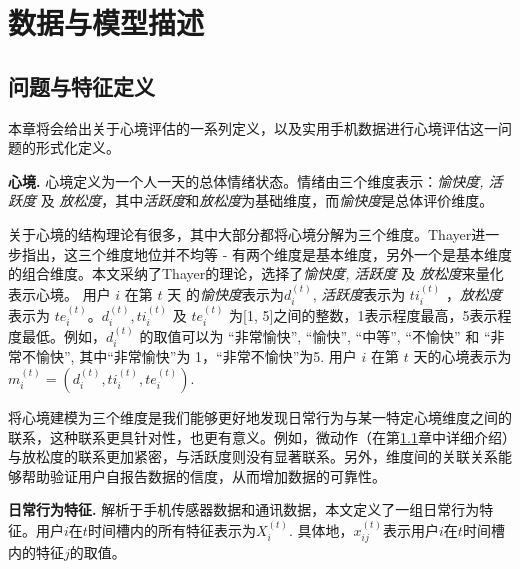 \section{数据与模型描述}\label{mood:data}

\subsection{问题与特征定义}
\label{mood:sec:ProblemAndFeatureDefinition}

本章将会给出关于心境评估的一系列定义，以及实用手机数据进行心境评估这一问题的形式化定义。
\begin{definition}
\textbf{心境.} 心境定义为一个人一天的总体情绪状态。情绪由三个维度表示：\textit{愉快度, 活跃度} 及 \textit{放松度}，其中\textit{活跃度}和\textit{放松度}为基础维度，而\textit{愉快度}是总体评价维度。
\end{definition}

关于心境的结构理论有很多，其中大部分都将心境分解为三个维度。Thayer\cite{mood}进一步指出，这三个维度地位并不均等 - 有两个维度是基本维度，另外一个是基本维度的组合维度。本文采纳了Thayer的理论，选择了\textit{愉快度, 活跃度} 及 \textit{放松度}来量化表示心境\cite{mooddimension}。 用户 $i$ 在第 $t$ 天 的\textit{愉快度}表示为$d_i^{(t)}$, \textit{活跃度}表示为 $ti_i^{(t)}$ ，\textit{放松度}表示为 $te_i^{(t)}$。$d_i^{(t)}, ti_i^{(t)}$ 及 $te_i^{(t)}$ 为[1, 5]之间的整数，1表示程度最高，5表示程度最低。例如，$d_i^{(t)}$ 的取值可以为 ``非常愉快'', ``愉快'', ``中等'', ``不愉快'' 和 ``非常不愉快'', 其中``非常愉快''为 1，``非常不愉快''为5. 用户 $i$ 在第 $t$ 天的心境表示为 $m_i^{(t)} = (d_i^{(t)}, ti_i^{(t)}, te_i^{(t)})$. 

将心境建模为三个维度是我们能够更好地发现日常行为与某一特定心境维度之间的联系，这种联系更具针对性，也更有意义。例如，微动作（在第\ref{mood:sec:ProblemAndFeatureDefinition}章中详细介绍）与放松度的联系更加紧密，与活跃度则没有显著联系。另外，维度间的关联关系能够帮助验证用户自报告数据的信度，从而增加数据的可靠性。

\begin{definition}
\textbf{日常行为特征.} 解析于手机传感器数据和通讯数据，本文定义了一组日常行为特征。用户$i$在$t$时间槽内的所有特征表示为$X_i^{(t)}$. 具体地，$x_{ij}^{(t)}$表示用户$i$在$t$时间槽内的特征$j$的取值。 
\end{definition}

